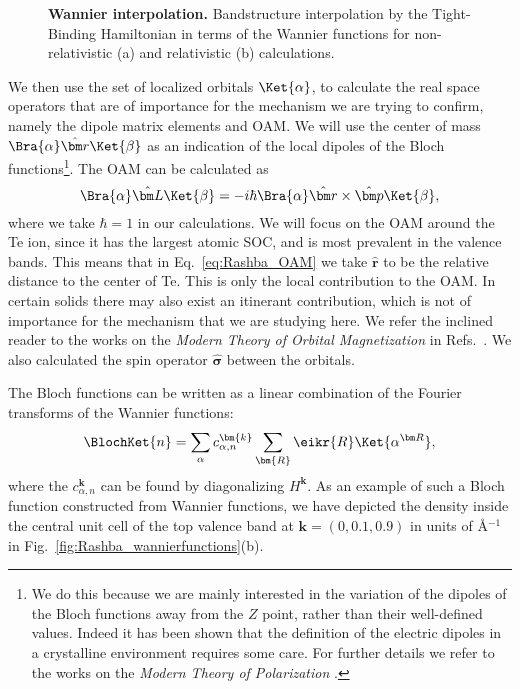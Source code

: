 \begin{figure}
\caption{\label{fig:Rashba_wannierization}{\bf Wannier interpolation.} Bandstructure interpolation by the Tight-Binding Hamiltonian in terms of the Wannier functions for non-relativistic (a) and relativistic (b) calculations.}
\end{figure}
We then use the set of localized orbitals $\Ket{\alpha}$, to calculate the real space operators that are of importance for the mechanism we are trying to confirm, namely the dipole matrix elements and OAM.
We will use the center of mass $\Bra{\alpha} \hat{\bm r} \Ket{\beta}$ as an indication of the local dipoles of the Bloch functions\footnote{We do this because we are mainly interested in the variation of the dipoles of the Bloch functions away from the $Z$ point, rather than their well-defined values. Indeed it has been shown that the definition of the electric dipoles in a crystalline environment requires some care. For further details we refer to the works on the {\it Modern Theory of Polarization} \cite{King-Smith1993,Vanderbilt1993,Resta1998, Spaldin2012,Vanderbilt18}.}.
The OAM can be calculated as
\begin{equation}
	\label{eq:Rashba_OAM}
	\Bra{\alpha}\hat{\bm L}\Ket{\beta} = -i\hbar \Bra{\alpha} \hat{\bm r} \times \hat{\bm p} \Ket{\beta},
\end{equation}
where we take $\hbar = 1$ in our calculations.
We will focus on the OAM around the Te ion, since it has the largest atomic SOC, and is most prevalent in the valence bands. This means that in Eq.~\eqref{eq:Rashba_OAM} we take $\hat{\bm r}$ to be the relative distance to the center of Te.
This is only the local contribution to the OAM. In certain solids there may also exist an itinerant contribution, which is not of importance for the mechanism that we are studying here. We refer the inclined reader to the works on the {\it Modern Theory of Orbital Magnetization} in Refs.~\cite{Thonhauser2005OrbitalInsulators,Ceresoli2006OrbitalMetals,Thonhauser2011,Vanderbilt18}.
We also calculated the spin operator $\hat{\bm \sigma}$ between the orbitals.

The Bloch functions can be written as a linear combination of the Fourier transforms of the Wannier functions:
\begin{equation}
	\label{eq:Rashba_blochfromwan}
	\BlochKet{n} = \sum_{\alpha} c_{\alpha, n}^{\bm{k}}\sum_{\bm{R}} \eikr{R}\Ket{\alpha^{\bm R}},
\end{equation}
where the $c_{\alpha,n}^{\bm{k}}$ can be found by diagonalizing $H^{\bm k}$. As an example of such a Bloch function constructed from Wannier functions, we have depicted the density inside the central unit cell of the top valence band at $\bm k = (0, 0.1, 0.9)$ in units of \AA$^{-1}$ in Fig.~\ref{fig:Rashba_wannierfunctions}(b).

